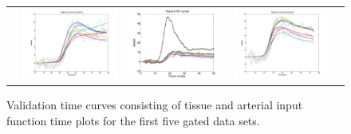 \documentclass{llncs}
\begin{document}
\begin{figure}
{\begin{tabular}{ccccc}
    \hspace{-5mm} &
    \includegraphics[width=40mm]{Figures/Results_jpg_DZnomask/MoCo_05_DZNoMask_Rest_Fit.jpg} 
    \hspace{-5mm} &
    \includegraphics[width=40mm]{Figures/Results_jpg_DZnomask/MoCo_05_DZNoMask_Stress_Curve.jpg} 
    \hspace{-5mm} &
    \includegraphics[width=40mm]{Figures/Results_jpg_DZnomask/MoCo_05_DZNoMask_Stress_Fit.jpg} \\
  \end{tabular}
  }
  \caption{Validation time curves consisting of tissue and arterial input function time plots 
  for the first five gated data sets.}
  \label{fig:gated1}
\end{figure}
\end{document}
